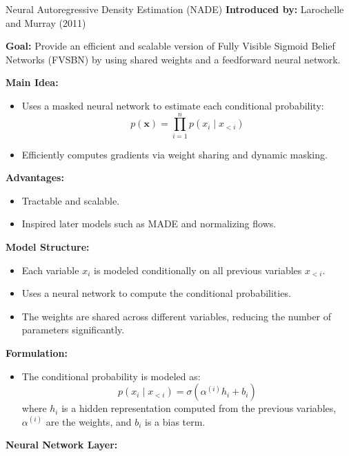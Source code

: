 \begin{frame}[allowframebreaks]{Neural Autoregressive Density Estimation (NADE)}
\textbf{Introduced by:} Larochelle and Murray (2011)

\textbf{Goal:} Provide an efficient and scalable version of Fully Visible Sigmoid Belief Networks (FVSBN) by using shared weights and a feedforward neural network.

\textbf{Main Idea:}
\begin{itemize}
    \item Uses a masked neural network to estimate each conditional probability:
    \vspace{-0.5em}
    \begin{equation*}
        p(\mathbf{x}) = \prod_{i=1}^n p(x_i \mid x_{<i})
    \end{equation*}
    \vspace{-0.5em}
    \item Efficiently computes gradients via weight sharing and dynamic masking.
\end{itemize}

\textbf{Advantages:}
\begin{itemize}
    \item Tractable and scalable.
    \item Inspired later models such as MADE and normalizing flows.
\end{itemize}

\framebreak
\textbf{Model Structure:}
\begin{itemize}
    \item Each variable $x_i$ is modeled conditionally on all previous variables $x_{<i}$.
    \item Uses a neural network to compute the conditional probabilities.
    \item The weights are shared across different variables, reducing the number of parameters significantly.
\end{itemize}
\textbf{Formulation:}
\begin{itemize}
    \item The conditional probability is modeled as:
    \begin{equation*}
        p(x_i \mid x_{<i}) = \sigma(\alpha^{(i)} h_i + b_i)
    \end{equation*}
    where $h_i$ is a hidden representation computed from the previous variables, $\alpha^{(i)}$ are the weights, and $b_i$ is a bias term.
\end{itemize}
\textbf{Neural Network Layer:}


\end{frame}
